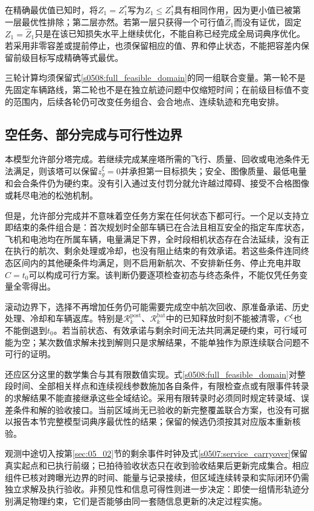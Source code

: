 在精确最优值已知时，将$Z_1=Z_1^*$写为$Z_1\le Z_1^*$具有相同作用，因为更小值已被第一层最优性排除；第二层亦然。若第一层只获得一个可行值$\widehat Z_1$而没有证优，固定$Z_1=\widehat Z_1$只是在该已知损失水平上继续优化，不能自称已经完成全局词典序优化。若采用非零容差或提前停止，也须保留相应的值、界和停止状态，不能把容差内保留前级目标写成精确等式最优。

三轮计算均须保留式\eqref{s0508:full_feasible_domain}的同一组联合变量。第一轮不是先固定车辆路线，第二轮也不是在独立航迹问题中仅缩短时间；在前级目标值不变的范围内，后续各轮仍可改变任务组合、会合地点、连续轨迹和充电安排。

\subsection{空任务、部分完成与可行性边界}

本模型允许部分塔完成。若继续完成某座塔所需的飞行、质量、回收或电池条件无法满足，则该塔可以保留$z_g^\xi=0$并承担第一目标损失；安全、图像质量、最低电量和会合条件仍为硬约束。没有引入通过支付罚分就允许越过障碍、接受不合格图像或耗尽电池的松弛机制。

但是，允许部分完成并不意味着空任务方案在任何状态下都可行。一个足以支持立即结束的条件组合是：首次规划时全部车辆已在合法且相互安全的指定车库状态，飞机和电池均在所属车辆，电量满足下界，全时段相机状态存在合法延续，没有正在执行的航次、剩余处理或冷却，也没有阻止结束的有效承诺。若这些条件连同终态区间内的其他硬条件均满足，则不启用新航次、不安排新任务、停止充电并取$C=t_0$可以构成可行方案。该判断仍要逐项检查初态与终态条件，不能仅凭任务变量全零得出。

滚动边界下，选择不再增加任务仍可能需要完成空中航次回收、原准备承诺、历史处理、冷却和车辆返库。特别是$\mathcal R_k^{\mathrm{post}}$、$\mathcal R_k^{\mathrm{bat}}$中的已知释放时刻不能被清零，$C^\xi$也不能倒退到$t_0$。若当前状态、有效承诺与剩余时间无法共同满足硬约束，可行域可能为空；某次数值求解未找到解则只是求解结果，不能单独作为原连续联合问题不可行的证明。

还应区分这里的数学集合与其有限数值实现。式\eqref{s0508:full_feasible_domain}对整段时间、全部相关样点和连续视线参数施加各自条件，有限检查点或有限事件转录的求解结果不能直接继承这些全域结论。采用有限转录时必须同时规定转录域、误差条件和解的验收接口。当前区域尚无已验收的新完整覆盖联合方案，也没有可据以报告本节完整模型词典序最优性的结果；保留的候选仍须按其对应版本重新核验。

观测中途切入按第\ref{sec:05_02}节的剩余事件时钟及式\eqref{s0507:service_carryover}保留真实起点和已执行前缀；已拍待验收状态只在收到验收结果后更新完成集合。相应组件已核对跨曝光边界的时间、能量与记录接续，但区域连续转录和实际闭环仍需独立求解及执行验收。非预见性和信息可得性则进一步决定：即使一组情形轨迹分别满足物理约束，它们是否能够由同一套随信息更新的决定过程实施。
